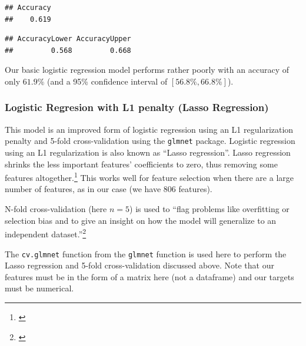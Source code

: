 \documentclass[12pt]{article}
\newenvironment{Shaded}{\begin{snugshade}}{\end{snugshade}}
\newcommand{\CommentTok}[1]{\textcolor[rgb]{0.56,0.35,0.01}{\textit{#1}}}
\newcommand{\DecValTok}[1]{\textcolor[rgb]{0.00,0.00,0.81}{#1}}
\newcommand{\KeywordTok}[1]{\textcolor[rgb]{0.13,0.29,0.53}{\textbf{#1}}}
\newcommand{\NormalTok}[1]{#1}
\newcommand{\OperatorTok}[1]{\textcolor[rgb]{0.81,0.36,0.00}{\textbf{#1}}}
\begin{document}
\begin{verbatim}
## Accuracy 
##    0.619
\end{verbatim}

\begin{Shaded}
\end{Shaded}

\begin{verbatim}
## AccuracyLower AccuracyUpper 
##         0.568         0.668
\end{verbatim}

Our basic logistic regression model performs rather poorly with an
accuracy of only \(61.9\%\) (and a 95\% confidence interval of
\([56.8\%, 66.8\%]\)).

\hypertarget{logistic-regresion-with-l1-penalty-lasso-regression}{%
\subsubsection{Logistic Regresion with L1 penalty (Lasso
Regression)}\label{logistic-regresion-with-l1-penalty-lasso-regression}}

This model is an improved form of logistic regression using an L1
regularization penalty and 5-fold cross-validation using the
\texttt{glmnet} package. Logistic regression using an L1 regularization
is also known as ``Lasso regression''. Lasso regression shrinks the less
important features' coefficients to zero, thus removing some features
altogether.\footnote{\citet{nagpalL1L2Regularization2017}} This works
well for feature selection when there are a large number of features, as
in our case (we have \(806\) features).

N-fold cross-validation (here \(n=5\)) is used to ``flag problems like
overfitting or selection bias and to give an insight on how the model
will generalize to an independent dataset.''\footnote{\citet{CrossvalidationStatistics2020}}

The \texttt{cv.glmnet} function from the \texttt{glmnet} function is
used here to perform the Lasso regression and 5-fold cross-validation
discussed above. Note that our features must be in the form of a matrix
here (not a dataframe) and our targets must be numerical.
\end{document}
